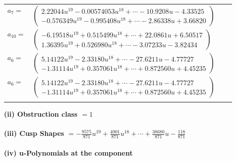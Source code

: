 \documentclass[1p]{elsarticle_modified}
\theoremstyle{definition}
\begin{document}
\begin{tabular}{m{7pt} m{180pt} m{7pt} m{180pt} }
\flushright $a_{7}=$&$\begin{pmatrix}2.22044 u^{19}-0.00574053 u^{18}+\cdots-10.9208 u-4.33525\\-0.576349 u^{19}-0.995408 u^{18}+\cdots-2.86338 u+3.66820\end{pmatrix}$ \\
\flushright $a_{10}=$&$\begin{pmatrix}-6.19518 u^{19}+0.515499 u^{18}+\cdots+22.0861 u+6.50517\\1.36395 u^{19}+0.526980 u^{18}+\cdots-3.07233 u-3.82434\end{pmatrix}$ \\
\flushright $a_{6}=$&$\begin{pmatrix}5.14122 u^{19}-2.33180 u^{18}+\cdots-27.6211 u-4.77727\\-1.31114 u^{19}+0.357061 u^{18}+\cdots+0.872560 u+4.45235\end{pmatrix}$\\ \flushright $a_{6}=$&$\begin{pmatrix}5.14122 u^{19}-2.33180 u^{18}+\cdots-27.6211 u-4.77727\\-1.31114 u^{19}+0.357061 u^{18}+\cdots+0.872560 u+4.45235\end{pmatrix}$\\&\end{tabular}
\flushleft \textbf{(ii) Obstruction class $= 1$}\\~\\
\flushleft \textbf{(iii) Cusp Shapes $= -\frac{9575}{871} u^{19}+\frac{4001}{871} u^{18}+\cdots+\frac{38680}{871} u-\frac{118}{871}$}\\~\\
\newpage\renewcommand{\arraystretch}{1}
\flushleft \textbf{(iv) u-Polynomials at the component}\newline \\
\end{document}
